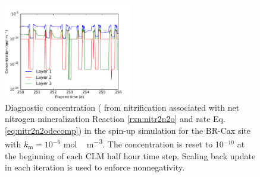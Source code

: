 \documentclass[gmd, manuscript]{copernicus}
\begin{document}
\begin{figure}[t]
\includegraphics[width=0.5\textwidth]{../figs/fig15/caxn2o.pdf}
\caption{Diagnostic  concentration ( from nitrification
associated with net nitrogen mineralization Reaction \ref{rxn:nitr2n2o} and
rate Eq. \ref{eq:nitr2n2odecomp}) in the spin-up simulation for the BR-Cax site
with $k_\text{m} = 10^{-6}$ \unit{mol\,m^{-3}}. The concentration is reset to
10$^{-10}$ at the beginning of each CLM half hour time step. Scaling back
update in each iteration is used to enforce nonnegativity.}
\label{fig:caxn2o}
\end{figure}


%


\clearpage
\end{document}
